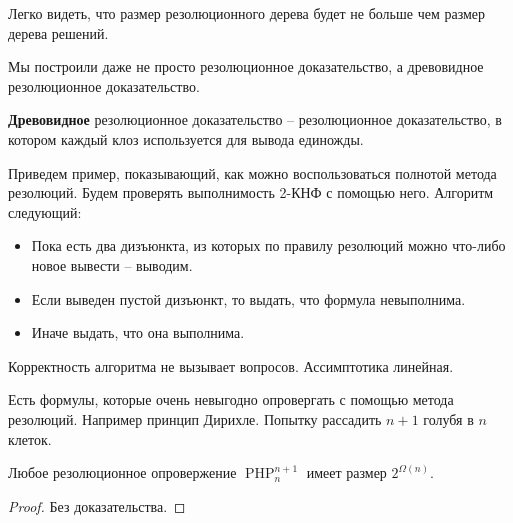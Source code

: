\notice \; Легко видеть, что размер резолюционного дерева будет не больше чем размер дерева решений. 

\notice \; Мы построили даже не просто резолюционное доказательство, а древовидное резолюционное доказательство. 

\begin{conj}
    \textbf{Древовидное} резолюционное доказательство -- резолюционное доказательство, в котором каждый клоз используется для вывода единожды. 
\end{conj}

Приведем пример, показывающий, как можно воспользоваться полнотой метода резолюций. Будем проверять выполнимость 2-КНФ с помощью него. Алгоритм следующий:
\begin{itemize}
    \item Пока есть два дизъюнкта, из которых по правилу резолюций можно что-либо новое вывести -- выводим. 
    \item Если выведен пустой дизъюнкт, то выдать, что формула невыполнима. 
    \item Иначе выдать, что она выполнима. 
\end{itemize}  
Корректность алгоритма не вызывает вопросов. Ассимптотика линейная. 

Есть формулы, которые очень невыгодно опровергать с помощью метода резолюций. Например принцип Дирихле. Попытку рассадить $n+1$ голубя в $n$ клеток. 
\begin{theorem}
    Любое резолюционное опровержение $\operatorname{PHP}^{n+1}_n$ имеет размер $2^{\Omega (n)}$.
\end{theorem}
\begin{proof}
    Без доказательства. 
\end{proof}

